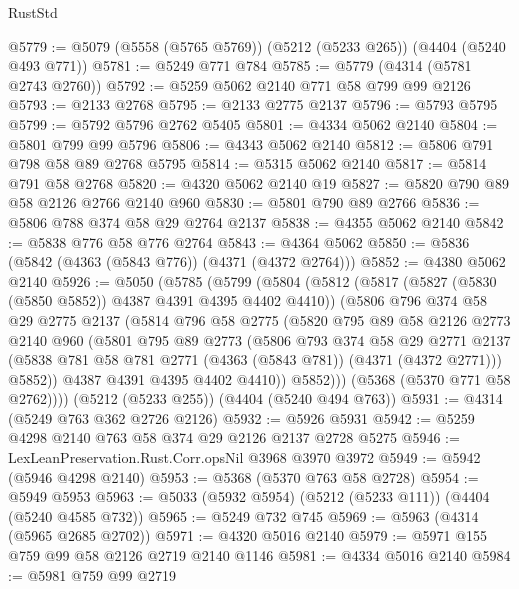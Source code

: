\begin{lexlean}{RustStd}
\begin{coremodule}
@5779 := @5079 (@5558 (@5765 @5769)) (@5212 (@5233 @265)) (@4404 (@5240 @493 @771))
@5781 := @5249 @771 @784
@5785 := @5779 (@4314 (@5781 @2743 @2760))
@5792 := @5259 @5062 @2140 @771 @58 @799 @99 @2126
@5793 := @2133 @2768
@5795 := @2133 @2775 @2137
@5796 := @5793 @5795
@5799 := @5792 @5796 @2762 @5405
@5801 := @4334 @5062 @2140
@5804 := @5801 @799 @99 @5796
@5806 := @4343 @5062 @2140
@5812 := @5806 @791 @798 @58 @89 @2768 @5795
@5814 := @5315 @5062 @2140
@5817 := @5814 @791 @58 @2768
@5820 := @4320 @5062 @2140 @19
@5827 := @5820 @790 @89 @58 @2126 @2766 @2140 @960
@5830 := @5801 @790 @89 @2766
@5836 := @5806 @788 @374 @58 @29 @2764 @2137
@5838 := @4355 @5062 @2140
@5842 := @5838 @776 @58 @776 @2764
@5843 := @4364 @5062
@5850 := @5836 (@5842 (@4363 (@5843 @776)) (@4371 (@4372 @2764)))
@5852 := @4380 @5062 @2140
@5926 := @5050
    (@5785
      (@5799
        (@5804
          (@5812
            (@5817 (@5827 (@5830 (@5850 @5852)) @4387 @4391 @4395 @4402 @4410))
            (@5806
              @796
              @374
              @58
              @29
              @2775
              @2137
              (@5814
                @796
                @58
                @2775
                (@5820
                  @795
                  @89
                  @58
                  @2126
                  @2773
                  @2140
                  @960
                  (@5801
                    @795
                    @89
                    @2773
                    (@5806
                      @793
                      @374
                      @58
                      @29
                      @2771
                      @2137
                      (@5838 @781 @58 @781 @2771 (@4363 (@5843 @781)) (@4371 (@4372 @2771)))
                      @5852))
                  @4387
                  @4391
                  @4395
                  @4402
                  @4410))
              @5852)))
        (@5368 (@5370 @771 @58 @2762))))
    (@5212 (@5233 @255))
    (@4404 (@5240 @494 @763))
@5931 := @4314 (@5249 @763 @362 @2726 @2126)
@5932 := @5926 @5931
@5942 := @5259 @4298 @2140 @763 @58 @374 @29 @2126 @2137 @2728 @5275
@5946 := LexLeanPreservation.Rust.Corr.opsNil @3968 @3970 @3972
@5949 := @5942 (@5946 @4298 @2140)
@5953 := @5368 (@5370 @763 @58 @2728)
@5954 := @5949 @5953
@5963 := @5033 (@5932 @5954) (@5212 (@5233 @111)) (@4404 (@5240 @4585 @732))
@5965 := @5249 @732 @745
@5969 := @5963 (@4314 (@5965 @2685 @2702))
@5971 := @4320 @5016 @2140
@5979 := @5971 @155 @759 @99 @58 @2126 @2719 @2140 @1146
@5981 := @4334 @5016 @2140
@5984 := @5981 @759 @99 @2719

\end{coremodule}
\end{lexlean}
